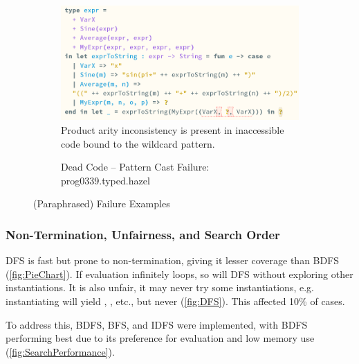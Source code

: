 \begin{figure}
\begin{subfigure}{0.7\textwidth}
\includegraphics[width=1\textwidth]{Media/Figures/dead_code_wildcard}
Product arity inconsistency is present in inaccessible code bound to the wildcard pattern.
\caption{Dead Code -- Pattern Cast Failure: prog0339.typed.hazel}
\end{subfigure}
\caption{(Paraphrased) Failure Examples}
\label{fig:FailureExamples}
\end{figure}

\label{sec:SearchCategories}
\subsubsection{Non-Termination, Unfairness, and Search Order}
DFS is fast but prone to non-termination, giving it lesser coverage than BDFS (\cref{fig:PieChart}). If evaluation infinitely loops, so will DFS without exploring other instantiations. It is also unfair, it may never try some instantiations, e.g. instantiating \code{(}\dyn\code{, }\dyn\code{)} will yield , , etc., but never  (\cref{fig:DFS}). This affected 10\% of cases.

To address this, BDFS, BFS, and IDFS were implemented, with BDFS performing best due to its preference for evaluation and low memory use (\cref{fig:SearchPerformance}).

